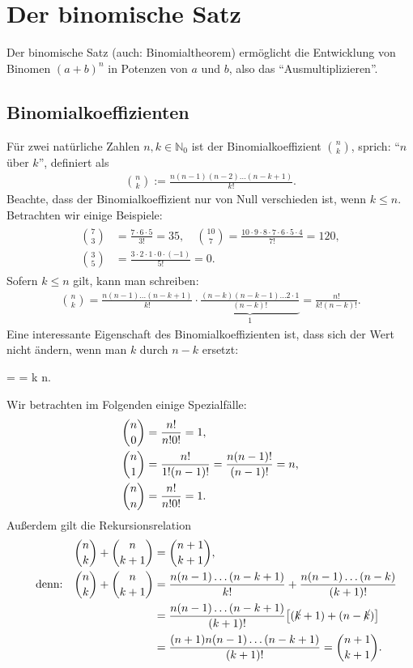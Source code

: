 \thispagestyle{plain}
\section{Der binomische Satz}

Der binomische Satz (auch: Binomialtheorem) ermöglicht die Entwicklung von Binomen $(a+b)^n$ in Potenzen von $a$ und $b$, also das ``Ausmultiplizieren''. 

\subsection{Binomialkoeffizienten}
Für zwei natürliche Zahlen $n,k \in \mathbb{N}_0$ ist der Binomialkoeffizient $\binom{n}{k}$, sprich: ``$n$ über $k$'', definiert als 
\begin{align}
    \binom{n}{k} := \frac{n(n-1)(n-2)\hdots (n-k+1)}{k!}.
\end{align}
Beachte, dass der Binomialkoeffizient nur von Null verschieden ist, wenn $k \le n$. Betrachten wir einige Beispiele: 
\begin{align}
    \begin{split}
        \binom{7}{3} &= \frac{7\cdot 6\cdot 5}{3!} = 35, \quad \binom{10}{7} = \frac{10\cdot 9 \cdot 8 \cdot 7 \cdot 6 \cdot 5 \cdot 4}{7!} = 120, \\
        \binom{3}{5} &= \frac{3 \cdot 2 \cdot 1 \cdot 0 \cdot (-1)}{5!} = 0.
    \end{split}
\end{align}
Sofern $k \le n$ gilt, kann man schreiben: 
\begin{align}
    \binom{n}{k} = \frac{n(n-1)\hdots (n-k+1)}{k!} \cdot \underbrace{\frac{(n-k)(n-k-1)\hdots 2 \cdot 1}{(n-k)!}}_{1} = \frac{n!}{k!(n-k)!}.
\end{align}
Eine interessante Eigenschaft des Binomialkoeffizienten ist, dass sich der Wert nicht ändern, wenn man $k$ durch $n-k$ ersetzt:
\begin{mymathbox}[ams align, title={Binomialkoeffizent}, colframe={FSUblau}]
 =  \qq{,}  =   k \le n.
\end{mymathbox}

Wir betrachten im Folgenden einige Spezialfälle: 
\begin{align}
    \binom{n}{0} &= \frac{n!}{n! 0!} = 1, \notag \\
    \binom{n}{1} &= \frac{n!}{1!(n-1)!} = \frac{n(n-1)!}{(n-1)!} =n, \\
    \binom{n}{n} &= \frac{n!}{n! 0!} = 1. \notag
\end{align}
Außerdem gilt die Rekursionsrelation 
\begin{align}
    \binom{n}{k} + \binom{n}{k+1} &= \binom{n+1}{k+1}, \label{eqn:11_Rekursion}\\
    \qq{denn:} \binom{n}{k} + \binom{n}{k+1} &= \frac{n(n-1)\hdots (n-k+1)}{k!} + \frac{n(n-1)\hdots (n-k)}{(k+1)!} \notag \\
    &= \frac{n(n-1)\hdots (n-k+1)}{(k+1)!} \qty[(\cancel{k}+1)+(n-\cancel{k})] \notag \\
    &= \frac{(n+1)n(n-1) \hdots (n-k+1)}{(k+1)!} = \binom{n+1}{k+1}.
\end{align}

